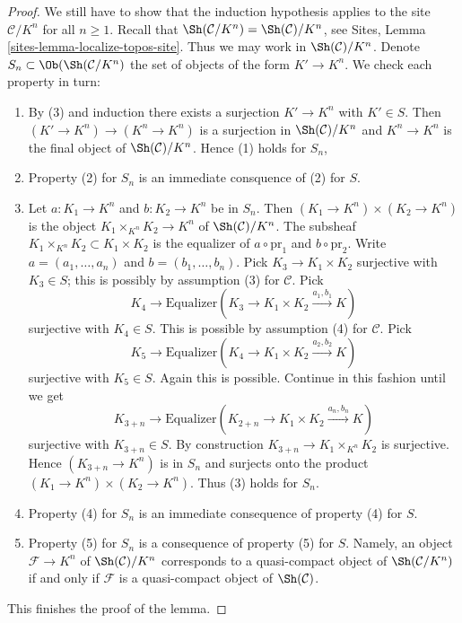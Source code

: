 \begin{proof}
\medskip\noindent
We still have to show that the induction hypothesis applies
to the site $\mathcal{C}/K^n$ for all $n \geq 1$. Recall
that $\Sh(\mathcal{C}/K^n) = \Sh(\mathcal{C})/K^n$, see
Sites, Lemma \ref{sites-lemma-localize-topos-site}.
Thus we may work in $\Sh(\mathcal{C})/K^n$.
Denote $S_n \subset \Ob(\Sh(\mathcal{C}/K^n)$ the set
of objects of the form $K' \to K^n$. We check each property in turn:
\begin{enumerate}
\item By (3) and induction there exists a surjection
$K' \to K^n$ with $K' \in S$. Then $(K' \to K^n) \to (K^n \to K^n)$
is a surjection in $\Sh(\mathcal{C})/K^n$ and $K^n \to K^n$
is the final object of $\Sh(\mathcal{C})/K^n$. Hence (1) holds for $S_n$,
\item Property (2) for $S_n$ is an immediate consquence
of (2) for $S$.
\item Let $a : K_1 \to K^n$ and $b : K_2 \to K^n$ be in $S_n$.
Then $(K_1 \to K^n) \times (K_2 \to K^n)$ is the object
$K_1 \times_{K^n} K_2 \to K^n$ of $\Sh(\mathcal{C})/K^n$.
The subsheaf $K_1 \times_{K^n} K_2 \subset K_1 \times K_2$ is the
equalizer of $a \circ \text{pr}_1$ and $b \circ \text{pr}_2$.
Write $a = (a_1, \ldots, a_n)$ and $b = (b_1, \ldots, b_n)$.
Pick $K_3 \to K_1 \times K_2$ surjective with $K_3 \in S$;
this is possibly by assumption (3) for $\mathcal{C}$.
Pick
$$
K_4
\longrightarrow
\text{Equalizer}(K_3 \to K_1 \times K_2 \xrightarrow{a_1, b_1} K)
$$
surjective with $K_4 \in S$.
This is possible by assumption (4) for $\mathcal{C}$.
Pick
$$
K_5
\longrightarrow
\text{Equalizer}(K_4 \to K_1 \times K_2 \xrightarrow{a_2, b_2} K)
$$
surjective with $K_5 \in S$.
Again this is possible. Continue in this fashion until we get
$$
K_{3 + n}
\longrightarrow
\text{Equalizer}(K_{2 + n} \to K_1 \times K_2 \xrightarrow{a_n, b_n} K)
$$
surjective with $K_{3 + n} \in S$. By construction
$K_{3 + n} \to K_1 \times_{K^n} K_2$
is surjective. Hence $(K_{3 + n} \to K^n)$ is in $S_n$ and
surjects onto the product $(K_1 \to K^n) \times (K_2 \to K^n)$.
Thus (3) holds for $S_n$.
\item Property (4) for $S_n$ is an immediate consequence of
property (4) for $S$.
\item Property (5) for $S_n$ is a consequence of
property (5) for $S$. Namely, an object $\mathcal{F} \to K^n$ of
$\Sh(\mathcal{C})/K^n$ corresponds to a quasi-compact object of
$\Sh(\mathcal{C}/K^n)$ if and only if $\mathcal{F}$ is a
quasi-compact object of $\Sh(\mathcal{C})$.
\end{enumerate}
This finishes the proof of the lemma.
\end{proof}

